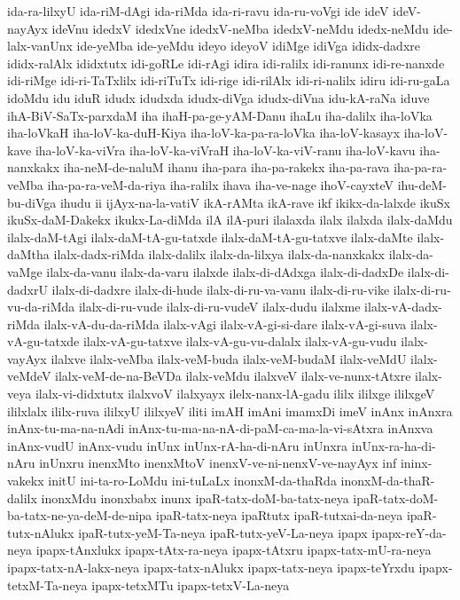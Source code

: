 {ida-ra-lilxyU
ida-riM-dAgi
ida-riMda
ida-ri-ravu
ida-ru-voVgi
ide
ideV
ideV-nayAyx
ideVnu
idedxV
idedxVne
idedxV-neMba
idedxV-neMdu
idedx-neMdu
ide-lalx-vanUnx
ide-yeMba
ide-yeMdu
ideyo
ideyoV
idiMge
idiVga
ididx-dadxre
ididx-ralAlx
ididxtutx
idi-goRLe
idi-rAgi
idira
idi-ralilx
idi-ranunx
idi-re-nanxde
idi-riMge
idi-ri-TaTxlilx
idi-riTuTx
idi-rige
idi-rilAlx
idi-ri-nalilx
idiru
idi-ru-gaLa
idoMdu
idu
iduR
idudx
idudxda
idudx-diVga
idudx-diVna
idu-kA-raNa
iduve
ihA-BiV-SaTx-parxdaM
iha
ihaH-pa-ge-yAM-Danu
ihaLu
iha-dalilx
iha-loVka
iha-loVkaH
iha-loV-ka-duH-Kiya
iha-loV-ka-pa-ra-loVka
iha-loV-kasayx
iha-loV-kave
iha-loV-ka-viVra
iha-loV-ka-viVraH
iha-loV-ka-viV-ranu
iha-loV-kavu
iha-nanxkakx
iha-neM-de-naluM
ihanu
iha-para
iha-pa-rakekx
iha-pa-rava
iha-pa-ra-veMba
iha-pa-ra-veM-da-riya
iha-ralilx
ihava
iha-ve-nage
ihoV-cayxteV
ihu-deM-bu-diVga
ihudu
ii
ijAyx-na-la-vatiV
ikA-rAMta
ikA-rave
ikf
ikikx-da-lalxde
ikuSx
ikuSx-daM-Dakekx
ikukx-La-diMda
ilA
ilA-puri
ilalaxda
ilalx
ilalxda
ilalx-daMdu
ilalx-daM-tAgi
ilalx-daM-tA-gu-tatxde
ilalx-daM-tA-gu-tatxve
ilalx-daMte
ilalx-daMtha
ilalx-dadx-riMda
ilalx-dalilx
ilalx-da-lilxya
ilalx-da-nanxkakx
ilalx-da-vaMge
ilalx-da-vanu
ilalx-da-varu
ilalxde
ilalx-di-dAdxga
ilalx-di-dadxDe
ilalx-di-dadxrU
ilalx-di-dadxre
ilalx-di-hude
ilalx-di-ru-va-vanu
ilalx-di-ru-vike
ilalx-di-ru-vu-da-riMda
ilalx-di-ru-vude
ilalx-di-ru-vudeV
ilalx-dudu
ilalxme
ilalx-vA-dadx-riMda
ilalx-vA-du-da-riMda
ilalx-vAgi
ilalx-vA-gi-si-dare
ilalx-vA-gi-suva
ilalx-vA-gu-tatxde
ilalx-vA-gu-tatxve
ilalx-vA-gu-vu-dalalx
ilalx-vA-gu-vudu
ilalx-vayAyx
ilalxve
ilalx-veMba
ilalx-veM-buda
ilalx-veM-budaM
ilalx-veMdU
ilalx-veMdeV
ilalx-veM-de-na-BeVDa
ilalx-veMdu
ilalxveV
ilalx-ve-nunx-tAtxre
ilalx-veya
ilalx-vi-didxtutx
ilalxvoV
ilalxyayx
ilelx-nanx-lA-gadu
ililx
ililxge
ililxgeV
ililxlalx
ililx-ruva
ililxyU
ililxyeV
iliti
imAH
imAni
imamxDi
imeV
inAnx
inAnxra
inAnx-tu-ma-na-nAdi
inAnx-tu-ma-na-nA-di-paM-ca-ma-la-vi-sAtxra
inAnxva
inAnx-vudU
inAnx-vudu
inUnx
inUnx-rA-ha-di-nAru
inUnxra
inUnx-ra-ha-di-nAru
inUnxru
inenxMto
inenxMtoV
inenxV-ve-ni-nenxV-ve-nayAyx
inf
ininx-vakekx
initU
ini-ta-ro-LoMdu
ini-tuLaLx
inonxM-da-thaRda
inonxM-da-thaR-dalilx
inonxMdu
inonxbabx
inunx
ipaR-tatx-doM-ba-tatx-neya
ipaR-tatx-doM-ba-tatx-ne-ya-deM-de-nipa
ipaR-tatx-neya
ipaRtutx
ipaR-tutxai-da-neya
ipaR-tutx-nAlukx
ipaR-tutx-yeM-Ta-neya
ipaR-tutx-yeV-La-neya
ipapx
ipapx-reY-da-neya
ipapx-tAnxlukx
ipapx-tAtx-ra-neya
ipapx-tAtxru
ipapx-tatx-mU-ra-neya
ipapx-tatx-nA-lakx-neya
ipapx-tatx-nAlukx
ipapx-tatx-neya
ipapx-teYrxdu
ipapx-tetxM-Ta-neya
ipapx-tetxMTu
ipapx-tetxV-La-neya
}
